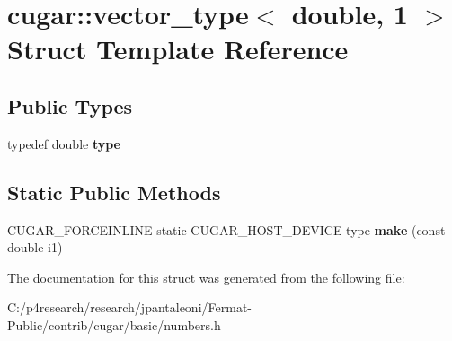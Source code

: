 \hypertarget{structcugar_1_1vector__type_3_01double_00_011_01_4}{}\section{cugar\+:\+:vector\+\_\+type$<$ double, 1 $>$ Struct Template Reference}
\label{structcugar_1_1vector__type_3_01double_00_011_01_4}
\subsection*{Public Types}
\begin{DoxyCompactItemize}
\item 
\mbox{\label{structcugar_1_1vector__type_3_01double_00_011_01_4_a783d4dab8d2e174a10c4c0358c09427f}} 
typedef double {\bfseries type}
\end{DoxyCompactItemize}
\subsection*{Static Public Methods}
\begin{DoxyCompactItemize}
\item 
\mbox{\label{structcugar_1_1vector__type_3_01double_00_011_01_4_a02cbcc1912efef55b55ac1b397d17ced}} 
C\+U\+G\+A\+R\+\_\+\+F\+O\+R\+C\+E\+I\+N\+L\+I\+NE static C\+U\+G\+A\+R\+\_\+\+H\+O\+S\+T\+\_\+\+D\+E\+V\+I\+CE type {\bfseries make} (const double i1)
\end{DoxyCompactItemize}


The documentation for this struct was generated from the following file\+:\begin{DoxyCompactItemize}
\item 
C\+:/p4research/research/jpantaleoni/\+Fermat-\/\+Public/contrib/cugar/basic/numbers.\+h\end{DoxyCompactItemize}

